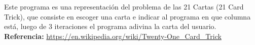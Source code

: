 Este programa es una representación del problema de las 21 Cartas (21 Card Trick), que consiste en escoger una carta e indicar al programa en que columna está, luego de 3 iteraciones el programa adivina la carta del usuario. \\ \textbf{Referencia: } \url{https://en.wikipedia.org/wiki/Twenty-One_Card_Trick}